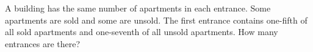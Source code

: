 A building has the same number of apartments in each entrance. Some apartments are sold and some are unsold. The first entrance contains one-fifth of all sold apartments and one-seventh of all unsold apartments. How many entrances are there?
